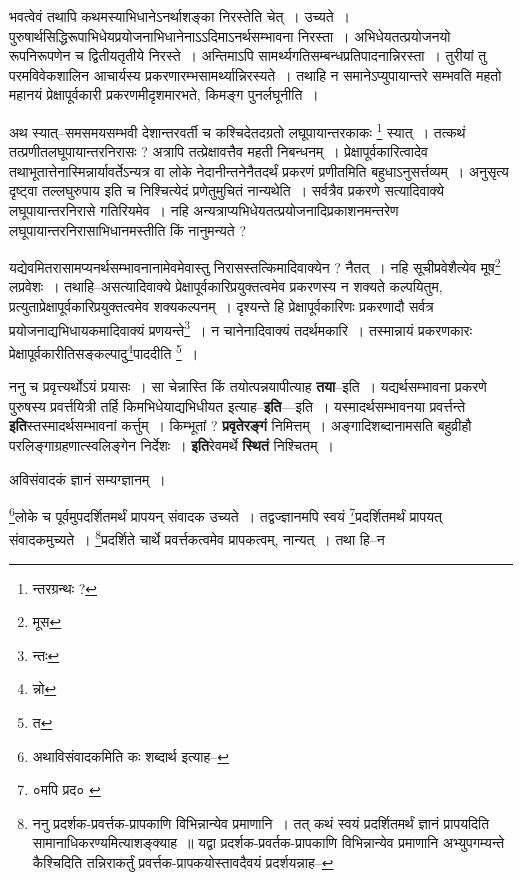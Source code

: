 \documentclass[article,12pt,a4paper]{memoir}
\begin{document}
	  \pstart भवत्वेवं तथापि कथमस्याभिधानेऽनर्थाशङ्का निरस्तेति चेत् । उच्यते । पुरुषार्थसिद्धिरूपाभिधेयप्रयोजनाभिधानेनाऽऽदिमाऽनर्थसम्भावना निरस्ता । अभिधेयतत्प्रयोजनयो रूपनिरूपणेन च द्वितीयतृतीये निरस्ते । अन्तिमाऽपि सामर्थ्यगतिसम्बन्धप्रतिपादनान्निरस्ता । तुरीयां तु परमविवेकशालिन आचार्यस्य प्रकरणारम्भसामर्थ्यान्निरस्यते । तथाहि न समानेऽप्युपायान्तरे सम्भवति महतो महानयं प्रेक्षापूर्वकारी प्रकरणमीदृशमारभते, किमङ्ग पुनर्लघूनीति ।
	\pend
      

	  \pstart अथ स्यात्--समसमयसम्भवी देशान्तरवर्ती च कश्चिदेतदग्रतो लघूपायान्तरकाकः \footnote{न्तरग्रन्थः ?} स्यात् । तत्कथं तत्प्रणीतलघूपायान्तरनिरासः ? अत्रापि तत्प्रेक्षावत्तैव महती निबन्धनम् । प्रेक्षापूर्वकारित्वादेव तथाभूतात्तेनास्मिन्नार्यावर्तेऽन्यत्र वा लोके नेदानीन्तनेनैतदर्थं प्रकरणं प्रणीतमिति बहुधाऽनुसर्त्तव्यम् । अनुसृत्य दृष्ट्वा तल्लघुरुपाय इति च निश्चित्येदं प्रणेतुमुचितं नान्यथेति । सर्वत्रैव प्रकरणे सत्यादिवाक्ये लघूपायान्तरनिरासे गतिरियमेव । नहि अन्यत्राप्यभिधेयतत्प्रयोजनादिप्रकाशनमन्तरेण लघूपायान्तरनिरासाभिधानमस्तीति किं नानुमन्यते ?
	\pend
      

	  \pstart यद्येवमितरासामप्यनर्थसम्भावनानामेवमेवास्तु निरासस्तत्किमादिवाक्येन ? नैतत् । नहि सूचीप्रवेशैत्येव मूष\footnote{मूस} लप्रवेशः । तथाहि--असत्यादिवाक्ये प्रेक्षापूर्वकारिप्रयुक्तत्वमेव प्रकरणस्य न शक्यते कल्पयितुम, प्रत्युताप्रेक्षापूर्वकारिप्रयुक्तत्वमेव शक्यकल्पनम् । दृश्यन्ते हि प्रेक्षापूर्वकारिणः प्रकरणादौ सर्वत्र प्रयोजनाद्यभिधायकमादिवाक्यं प्रणयन्ते\footnote{न्तः} । न चानेनादिवाक्यं तदर्थमकारि । तस्मान्नायं प्रकरणकारः प्रेक्षापूर्वकारीतिसङ्कल्पादु\footnote{न्नो}पाददीति \footnote{त} ।
	\pend
      

	  \pstart ननु च प्रवृत्त्यर्थोऽयं प्रयासः । सा चेन्नास्ति किं तयोत्पन्नयापीत्याह \textbf{तया}--इति । यद्यर्थसम्भावना प्रकरणे पुरुषस्य प्रवर्त्तयित्री तर्हि किमभिधेयाद्यभिधीयत इत्याह--\textbf{इति}—इति । यस्मादर्थसम्भावनया प्रवर्त्तन्ते \textbf{इति}स्तस्मादर्थसम्भावनां कर्त्तुम् । किम्भूतां ? \textbf{प्रवृतेरङ्गं} निमित्तम् । अङ्गादिशब्दानामसति बहुव्रीहौ परलिङ्गाग्रहणात्स्वलिङ्गेन निर्देशः । \textbf{इति}रेवमर्थे \textbf{स्थितं} निश्चितम् ।
	\pend
      \leavevmode{}
	  \bigskip
	  \begingroup
	

	  \pstart अविसंवादकं ज्ञानं सम्यग्ज्ञानम् ।
	\pend
       

	  \pstart \footnote{अथाविसंवादकमिति कः शब्दार्थ इत्याह--\cite{dp-msD-n}}लोके च पूर्वमुपदर्शितमर्थं प्रापयन् संवादक उच्यते । तद्वज्ज्ञानमपि स्वयं \footnote{०मपि प्रद० \cite{dp-msA} \cite{dp-msC} \cite{dp-msD} \cite{dp-edP} \cite{dp-edE}}प्रदर्शितमर्थं प्रापयत् संवादकमुच्यते । \footnote{ननु प्रदर्शक-प्रवर्त्तक-प्रापकाणि विभिन्नान्येव प्रमाणानि । तत् कथं स्वयं प्रदर्शितमर्थं ज्ञानं प्रापयदिति सामानाधिकरण्यमित्याशङ्क्याह ॥ यद्वा प्रदर्शक-प्रवर्तक-प्रापकाणि विभिन्नान्येव प्रमाणानि अभ्युपगम्यन्ते कैश्चिदिति तन्निराकर्तुं प्रवर्त्तक-प्रापकयोस्तावदैवयं प्रदर्शयन्नाह--\cite{dp-msD-n}}प्रदर्शिते चार्थे प्रवर्त्तकत्वमेव प्रापकत्वम्, नान्यत् । तथा हि--न
	\pend
      
\end{document}
